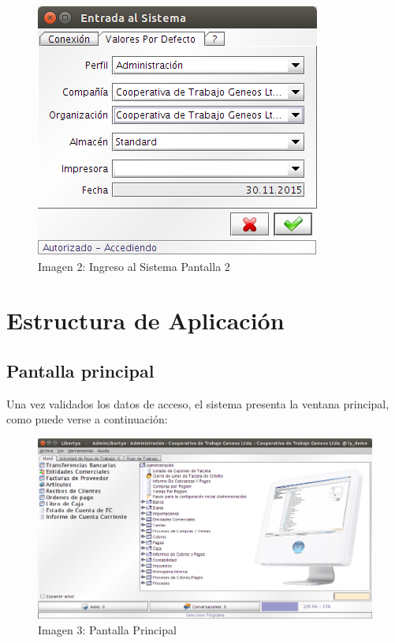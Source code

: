 \documentclass[letterpaper,10pt,spanish]{sphinxmanual}
\begin{document}
\begin{figure}[htbp]
\centering
\capstart

\includegraphics{ly_login_rol.png}
\caption{Imagen 2: Ingreso al Sistema Pantalla 2}\end{figure}


\chapter{Estructura de Aplicación}
\label{estructura:estructura-de-aplicacion}\label{estructura::doc}

\section{Pantalla principal}
\label{estructura:pantalla-principal}
Una vez validados los datos de acceso, el sistema presenta la ventana principal, como puede verse a continuación:
\begin{figure}[htbp]
\centering
\capstart

\includegraphics{ly_inicio.png}
\caption{Imagen 3: Pantalla Principal}\end{figure}
\end{document}
